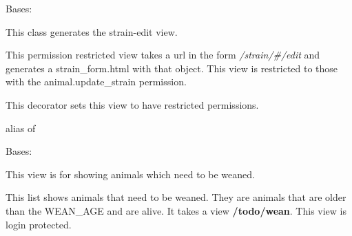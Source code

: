 \documentclass[letterpaper,10pt,english]{sphinxmanual}
\begin{document}
\begin{fulllineitems}
\label{api:mousedb.animal.views.StrainUpdate}
Bases: \href{http://docs.djangoproject.com/en/dev/ref/class-based-views/\#django.views.generic.edit.UpdateView}{}

This class generates the strain-edit view.

This permission restricted view takes a url in the form \emph{/strain/\#/edit} and generates a strain\_form.html with that object.
This view is restricted to those with the animal.update\_strain permission.


\begin{fulllineitems}
\label{api:mousedb.animal.views.StrainUpdate.dispatch}
This decorator sets this view to have restricted permissions.

\end{fulllineitems}



\begin{fulllineitems}
\label{api:mousedb.animal.views.StrainUpdate.model}
alias of 

\end{fulllineitems}


\end{fulllineitems}



\begin{fulllineitems}
\label{api:mousedb.animal.views.WeanList}
Bases: {\hyperref[api:mousedb.animal.views.AnimalList]{}}

This view is for showing animals which need to be weaned.

This list shows animals that need to be weaned.  They are animals that are older than the WEAN\_AGE and are alive.
It takes a view \textbf{/todo/wean}.
This view is login protected.

\end{fulllineitems}
\end{document}
